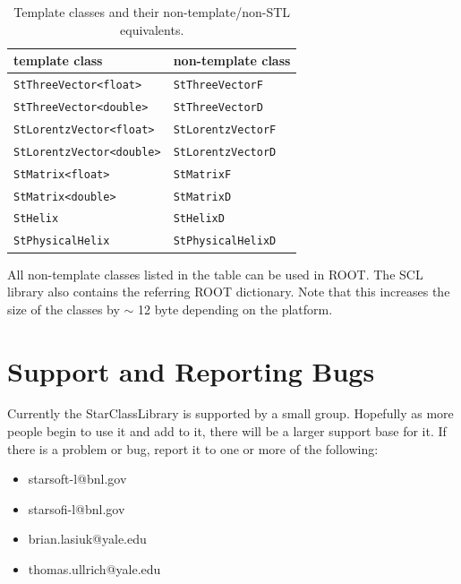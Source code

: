 \documentclass[twoside]{article}
\newcommand{\name}[1]{\textsf{#1}}%
\begin{document}
\begin{table}[htb]
    \begin{center}
    \begin{tabular}{|l|l|}
        \hline
        \textbf{template class} & \textbf{non-template class} \\ \hline
        \verb+StThreeVector<float>+ & \verb+StThreeVectorF+ \\ \hline
        \verb+StThreeVector<double>+ & \verb+StThreeVectorD+ \\ \hline
        \verb+StLorentzVector<float>+ & \verb+StLorentzVectorF+ \\ \hline
        \verb+StLorentzVector<double>+ & \verb+StLorentzVectorD+ \\ \hline
        \verb+StMatrix<float>+ & \verb+StMatrixF+ \\ \hline
        \verb+StMatrix<double>+ & \verb+StMatrixD+ \\ \hline
        \verb+StHelix+ & \verb+StHelixD+ \\ \hline
        \verb+StPhysicalHelix+ & \verb+StPhysicalHelixD+ \\ \hline
    \end{tabular}            
    \caption{Template classes and their non-template/non-STL equivalents.}
    \label{tab:templates}
    \end{center}
\end{table}

All non-template classes listed in the table can be used in ROOT. The SCL library also
contains the referring ROOT dictionary. Note that this increases the size of the classes
by $\sim$ 12 byte depending on the platform.

\section{Support and Reporting Bugs} 
Currently the \name{StarClassLibrary} is supported by a small group.  Hopefully
as more people begin to use it and add to it, there will be a larger
support base for it.  If there is a problem or bug, report it to
one or more of the following:
\begin{itemize}
  \item starsoft-l@bnl.gov
  \item starsofi-l@bnl.gov
  \item brian.lasiuk@yale.edu
  \item thomas.ullrich@yale.edu
\end{itemize}
\end{document}

